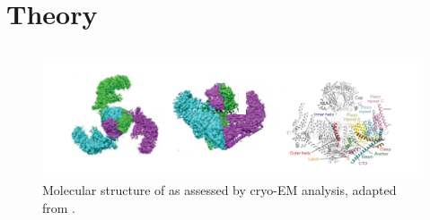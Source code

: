 \section{Theory}

\subsection{\Piezo{}}


\begin{figure}
	\centering
	\includegraphics[width=0.6\linewidth]{PiezoMolecule.png}
	\caption{Molecular structure of \Piezo{} as assessed by cryo-EM analysis, adapted from \cite{Saotome2018, Zhao2018}.}
	\label{pic:Piezo}
\end{figure}



